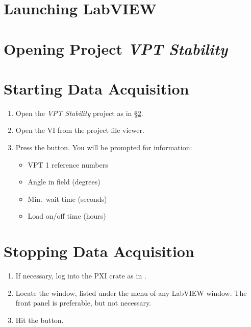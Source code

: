 \section{Launching LabVIEW}
\label{sec:op_pxi:labview_launch}

\section{Opening Project \textit{VPT Stability}}
\label{sec:op_pxi:project_vptstability}

\section{Starting Data Acquisition}
\label{sec:op_pxi:daq_start}

\begin{enumerate}
\item Open the \textit{VPT Stability} project as in \S\ref{sec:op_pxi:project_vptstability}.
\item Open the  VI from the project file viewer.
\item Press the   button.  You will be prompted for information:
  \begin{itemize}
  \item VPT 1 reference numbers
  \item Angle in field (degrees)
  \item Min.\ wait time (seconds)
  \item Load on/off time (hours)
  \end{itemize}
\end{enumerate}

\section{Stopping Data Acquisition}
\label{sec:op_pxi:daq_stop}
\begin{enumerate}
\item If necessary, log into the PXI crate as in .
\item Locate the  window, listed under the  menu of any LabVIEW window.  The front panel is preferable, but not necessary.
\item Hit the   button.
\end{enumerate}

